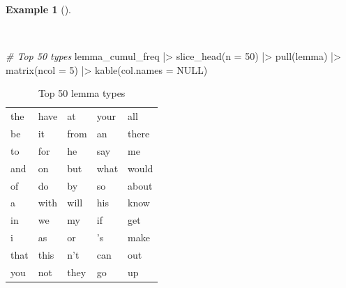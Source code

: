 \documentclass[
  letterpaper,
  krantz1]{latex/krantz-mod}
\newenvironment{Shaded}{\begin{snugshade}}{\end{snugshade}}
\newcommand{\AttributeTok}[1]{\textcolor[rgb]{0.00,0.00,0.00}{#1}}
\newcommand{\CommentTok}[1]{\textcolor[rgb]{0.00,0.00,0.00}{\textit{#1}}}
\newcommand{\ConstantTok}[1]{\textcolor[rgb]{0.00,0.00,0.00}{#1}}
\newcommand{\DecValTok}[1]{\textcolor[rgb]{0.00,0.00,0.00}{#1}}
\newcommand{\FunctionTok}[1]{\textcolor[rgb]{0.00,0.00,0.00}{#1}}
\newcommand{\NormalTok}[1]{\textcolor[rgb]{0.00,0.00,0.00}{#1}}
\newcommand{\SpecialCharTok}[1]{\textcolor[rgb]{0.00,0.00,0.00}{#1}}
\theoremstyle{definition}
\newtheorem{example}{Example}[chapter]
\theoremstyle{definition}
\theoremstyle{remark}
\begin{document}
\begin{example}[]\protect\hypertarget{exm-explore-masc-count-top-50}{}\label{exm-explore-masc-count-top-50}

~

\begin{Shaded}
\begin{Highlighting}[numbers=left,,]
\CommentTok{\# Top 50 types}
\NormalTok{lemma\_cumul\_freq }\SpecialCharTok{|\textgreater{}}
  \FunctionTok{slice\_head}\NormalTok{(}\AttributeTok{n =} \DecValTok{50}\NormalTok{) }\SpecialCharTok{|\textgreater{}}
  \FunctionTok{pull}\NormalTok{(lemma) }\SpecialCharTok{|\textgreater{}}
  \FunctionTok{matrix}\NormalTok{(}\AttributeTok{ncol =} \DecValTok{5}\NormalTok{) }\SpecialCharTok{|\textgreater{}}
  \FunctionTok{kable}\NormalTok{(}\AttributeTok{col.names =} \ConstantTok{NULL}\NormalTok{)}
\end{Highlighting}
\end{Shaded}

\begin{longtable}[]{@{}
  >{\raggedright\arraybackslash}p{}
  >{\raggedright\arraybackslash}p{}
  >{\raggedright\arraybackslash}p{}
  >{\raggedright\arraybackslash}p{}
  >{\raggedright\arraybackslash}p{}@{}}

\caption{\label{tbl-explore-masc-count-top-50}Top 50 lemma types}

\tabularnewline

\toprule\noalign{}
\endhead
\bottomrule\noalign{}
\endlastfoot
the & have & at & your & all \\
be & it & from & an & there \\
to & for & he & say & me \\
and & on & but & what & would \\
of & do & by & so & about \\
a & with & will & his & know \\
in & we & my & if & get \\
i & as & or & 's & make \\
that & this & n't & can & out \\
you & not & they & go & up \\

\end{longtable}

\end{example}
\end{document}
